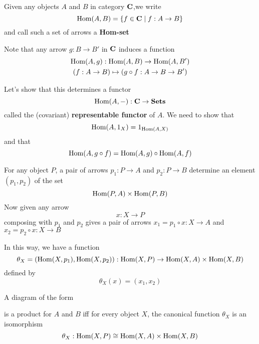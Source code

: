 \documentclass[11pt]{article}
\begin{document}
Given any objects \(A\) and \(B\)  in category \(\operatorname{\textbf{C}}\),we write
\begin{equation*}
\operatorname{Hom}(A,B)=\{f\in\operatorname{\textbf{C}}\mid f:A\to B\}
\end{equation*}
and call such a set of arrows a \textbf{Hom-set}

Note that any arrow \(g:B\to B'\) in \(\operatorname{\textbf{C}}\) induces a function
\begin{gather*}
\operatorname{Hom}(A,g):\operatorname{Hom}(A,B)\to\operatorname{Hom}(A,B')\\
(f:A\to B)\mapsto(g\circ f:A\to B\to B')
\end{gather*}

Let's show that this determines a functor
\begin{equation*}
\operatorname{Hom}(A,-):\operatorname{\textbf{C}}\to\operatorname{\textbf{Sets}}
\end{equation*}
called the (covariant) \textbf{representable functor} of \(A\). We need to show that
\begin{equation*}
\operatorname{Hom}(A,1_X)=1_{\operatorname{Hom}(A,X)}
\end{equation*}
and that
\begin{equation*}
\operatorname{Hom}(A,g\circ f)=\operatorname{Hom}(A,g)\circ\operatorname{Hom}(A,f)
\end{equation*}

For any object \(P\), a pair of arrows \(p_1:P\to A\) and \(p_2:P\to B\)
determine an element \((p_1,p_2)\) of the set
\begin{equation*}
\operatorname{Hom}(P,A)\times\operatorname{Hom}(P,B)
\end{equation*}
Now given any arrow
\begin{equation*}
x:X\to P
\end{equation*}
composing with \(p_1\) and \(p_2\) gives a pair of arrows
\(x_1=p_1\circ x:X\to A\) and \(x_2=p_2\circ x:X\to B\)

In this way, we have a function
\begin{equation*}
\theta_X=(\operatorname{Hom}(X,p_1),\operatorname{Hom}(X,p_2)):\operatorname{Hom}(X,P)\to\operatorname{Hom}(X,A)\times\operatorname{Hom}(X,B)
\end{equation*}
defined by
\begin{equation*}
\theta_X(x)=(x_1,x_2)
\end{equation*}
\begin{proposition}[]
A diagram of the form
\begin{center}\end{center}
is a product for \(A\) and \(B\) iff for every object \(X\), the canonical
function \(\theta_X\) is an isomorphism
\begin{equation*}
\theta_X:\operatorname{Hom}(X,P)\cong\operatorname{Hom}(X,A)\times\operatorname{Hom}(X,B)
\end{equation*}
\end{proposition}
\end{document}
